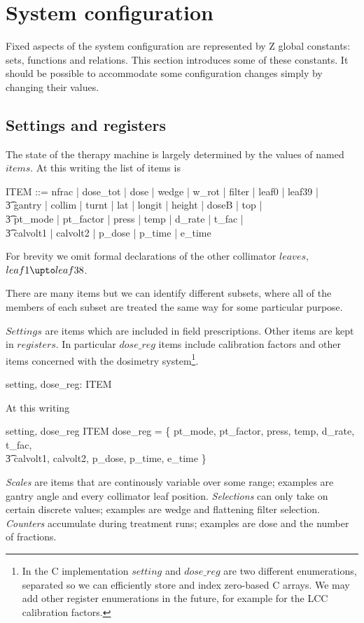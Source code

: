 \documentclass{article}
\begin{document}
\section{System configuration} \label{sect:config}

Fixed aspects of the system configuration are represented by Z global
constants: sets, functions and relations.  This section introduces
some of these constants.  It should be possible to accommodate some
configuration changes simply by changing their values.

\subsection{Settings and registers} \label{sect:settings}

The state of the therapy machine is largely determined by the values
of named $items$.  At this writing the list of items is

\begin{zed} 
ITEM ::= nfrac | dose\_tot | dose | wedge | w\_rot | filter | leaf0 | leaf39 | \\
\t3	gantry | collim | turnt | lat | longit | height | doseB | top | \\
\t3	pt\_mode | pt\_factor | press | temp | d\_rate | t\_fac | \\
\t3	calvolt1 | calvolt2 | p\_dose | p\_time | e\_time
\end{zed}
For brevity we omit formal declarations of the other collimator $leaves$,
$leaf1 \upto leaf38$.

There are many items but we can identify different subsets, where all
of the members of each subset are treated the same way for some
particular purpose.
  
$Settings$ are items which are included in field prescriptions.  Other
items are kept in $registers$.  In particular $dose\_reg$ items
include calibration factors and other items concerned with the
dosimetry system\footnote{In the C implementation $setting$ and
$dose\_reg$ are two different enumerations, separated so we can
efficiently store and index zero-based C arrays.  We may add other
register enumerations in the future, for example for the LCC
calibration factors.}.

\begin{axdef}
	setting, dose\_reg: \power ITEM \\
\end{axdef}
At this writing

\begin{zed}
	\langle setting, dose\_reg \rangle \partition ITEM
\also
	dose\_reg = \{ pt\_mode, pt\_factor, press, temp, d\_rate, t\_fac, \\
\t3		calvolt1, calvolt2, p\_dose, p\_time, e\_time \}
\end{zed}
{\em Scales} are items that are continously variable over some range;
examples are gantry angle and every collimator leaf position.  
{\em Selections} can only take on certain discrete values; examples are
wedge and flattening filter selection.  {\em Counters} accumulate
during treatment runs; examples are dose and the number of fractions.
\end{document}
